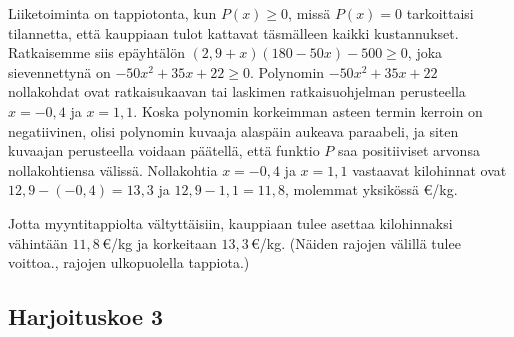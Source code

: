 \begin{multicols}{2}
\begin{tehtava}
\begin{vastaus}
{Liiketoiminta on tappiotonta, kun $P(x)\geq0$, missä $P(x)=0$ tarkoittaisi tilannetta, että kauppiaan tulot kattavat täsmälleen kaikki kustannukset. Ratkaisemme siis epäyhtälön $(2,9+x)(180-50x)-500\geq0$, joka sievennettynä on $-50x^2+35x+22\geq0$. Polynomin $-50x^2+35x+22$ nollakohdat ovat ratkaisukaavan tai laskimen ratkaisuohjelman perusteella $x=-0,4$ ja $x=1,1$. Koska polynomin korkeimman asteen termin kerroin on negatiivinen, olisi polynomin kuvaaja alaspäin aukeava paraabeli, ja siten kuvaajan perusteella voidaan päätellä, että funktio $P$ saa positiiviset arvonsa nollakohtiensa välissä. Nollakohtia $x=-0,4$ ja $x=1,1$ vastaavat kilohinnat ovat $12,9-(-0,4)=13,3$ ja $12,9-1,1=11,8$, molemmat yksikössä €/kg.

Jotta myyntitappiolta vältyttäisiin, kauppiaan tulee asettaa kilohinnaksi vähintään $11,8$\,€/kg ja korkeitaan $13,3$\,€/kg. (Näiden rajojen välillä tulee voittoa., rajojen ulkopuolella tappiota.)
		}
	\end{vastaus}
\end{tehtava}

\end{multicols}
\newpage
\subsection*{Harjoituskoe 3}

